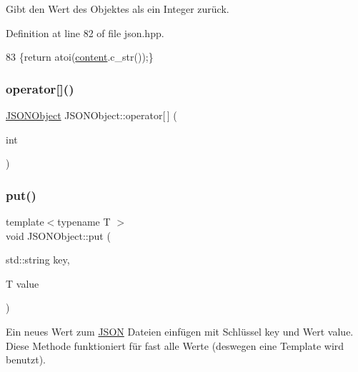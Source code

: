 Gibt den Wert des Objektes als ein Integer zurück. 

Definition at line 82 of file json.\+hpp.


\begin{DoxyCode}
83 \{\textcolor{keywordflow}{return} atoi(\mbox{\hyperlink{class_j_s_o_n_ad1ace77234b963a2994178ce7f76a181}{content}}.c\_str());\}
\end{DoxyCode}
\mbox{\label{class_j_s_o_n_object_a2aa0258a2d408f348934e470f2c26e94}} 
\subsubsection{\texorpdfstring{operator[]()}{operator[]()}}
{\footnotesize\ttfamily \mbox{\hyperlink{class_j_s_o_n_object}{J\+S\+O\+N\+Object}} J\+S\+O\+N\+Object\+::operator\mbox{[}$\,$\mbox{]} (\begin{DoxyParamCaption}\item[{int}]{ }\end{DoxyParamCaption})}

\mbox{\label{class_j_s_o_n_object_abe961a3b81398975838f4c51a694c81a}} 
\subsubsection{\texorpdfstring{put()}{put()}\hspace{0.1cm}{\footnotesize\ttfamily [1/4]}}
{\footnotesize\ttfamily template$<$typename T $>$ \\
void J\+S\+O\+N\+Object\+::put (\begin{DoxyParamCaption}\item[{std\+::string}]{key,  }\item[{T}]{value }\end{DoxyParamCaption})\hspace{0.3cm}{\ttfamily [inline]}}

Ein neues Wert zum \mbox{\hyperlink{class_j_s_o_n}{J\+S\+ON}} Dateien einfügen mit Schlüssel {\ttfamily key} und Wert {\ttfamily value}. Diese Methode funktioniert für fast alle Werte (deswegen eine Template wird benutzt). 


